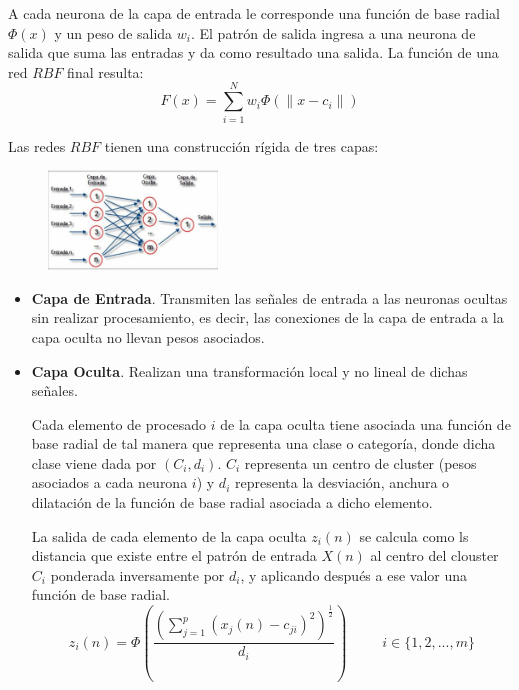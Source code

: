 \documentclass[letterpaper,11pt]{article}
\begin{document}
\begin{enumerate}
    A cada neurona de la capa de entrada le corresponde una función de base 
    radial $\Phi (x)$ y un peso de salida $w_i$. El patrón de salida ingresa a
    una neurona de salida que suma las entradas y da como resultado una salida.
    La función de una red $RBF$ final resulta:
    \begin{equation*}
        F(x) = \sum^N_{i=1} w_{i} \Phi (\| x - c_{i} \|)
    \end{equation*} 

    Las redes $RBF$ tienen una construcción rígida de tres capas:
    \begin{figure}[ht]
        \centering
        \includegraphics[width=0.4\textwidth]{./imagenes/rbf.png}
    \end{figure}  

    \begin{itemize}
        \item \textbf{Capa de Entrada}. Transmiten las señales de entrada a las 
        neuronas ocultas sin realizar procesamiento, es decir, las conexiones de 
        la capa de entrada a la capa oculta no llevan pesos asociados. 

        \item \textbf{Capa Oculta}. Realizan una transformación local y no lineal 
        de dichas señales.

        Cada elemento de procesado $i$ de la capa oculta tiene asociada una 
        función de base radial de tal manera que representa una clase o 
        categoría, donde dicha clase viene dada por $(C_i, d_i)$. $C_i$
        representa un centro de cluster (pesos asociados a cada neurona $i$) y 
        $d_i$ representa la desviación, anchura o dilatación de la función de 
        base radial asociada a dicho elemento. 

        La salida de cada elemento de la capa oculta $z_i (n)$ se calcula como 
        ls distancia que existe entre el patrón de entrada $X (n)$ al centro del 
        clouster $C_i$ ponderada inversamente por $d_i$, y aplicando después a 
        ese valor una función de base radial.
        \begin{equation*}
            z_i (n) = 
            \Phi \left(\frac{\left( \sum^p_{j=1} \left( x_j (n) - c_{ji} 
                                                 \right)^2 \right)^{\frac{1}{2}}}
                            {d_i} \right) \; \; \; \; \; \; \; \; \; 
            i \in \{1, 2, ..., m\}
        \end{equation*}


\end{itemize}
\end{enumerate}
\end{document}
